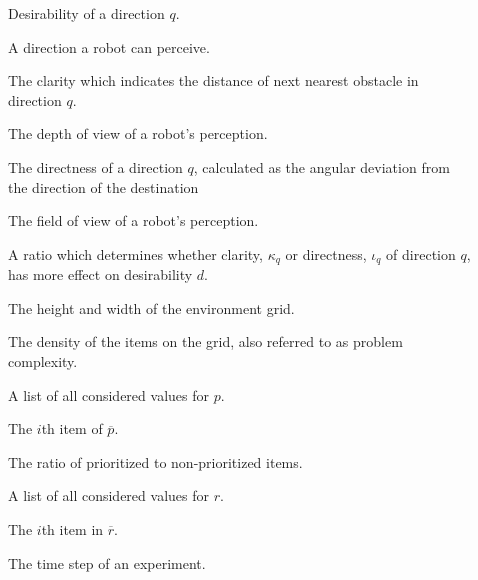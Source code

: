 \begin{description}
	\item[\parbox{\namewidth}{$d$}] Desirability of a direction $q$.
	\item[\parbox{\namewidth}{$q$}] A direction a robot can perceive.
	
	\item[\parbox{\namewidth}{$\kappa_q$}] The clarity which indicates the distance of next nearest obstacle in direction $q$.
	 
	\item[\parbox{\namewidth}{$\eta$}] The depth of view of a robot's perception.

	\item[\parbox{\namewidth}{$\iota_q$}] The directness of a direction $q$, calculated as the angular deviation from the direction of the destination

	\item[\parbox{\namewidth}{$f$}] The	field of view of a robot's perception.
		
	\item[\parbox{\namewidth}{$\lambda$}] A ratio which determines whether clarity, $\kappa_q$ or directness, $\iota_q$ of direction $q$, has more effect on desirability $d$.
	
	\item[\parbox{\namewidth}{$\Lambda$}] The height and width of the environment grid.

	\item[\parbox{\namewidth}{$p$}] The density of the items on the grid, also referred to as problem complexity.

	\item[\parbox{\namewidth}{$\overline{p}$}] A list of all considered values for $p$.

	\item[\parbox{\namewidth}{$p_i$}] The $i$th item of $\overline{p}$.
	
	\item[\parbox{\namewidth}{$r$}] The ratio of prioritized to non-prioritized items.

	\item[\parbox{\namewidth}{$\overline{r}$}] A list of all considered values for $r$.

	\item[\parbox{\namewidth}{$r_i$}] The $i$th item in $\overline{r}$.

	\item[\parbox{\namewidth}{$t$}] The time step of an experiment.	


\end{description}
